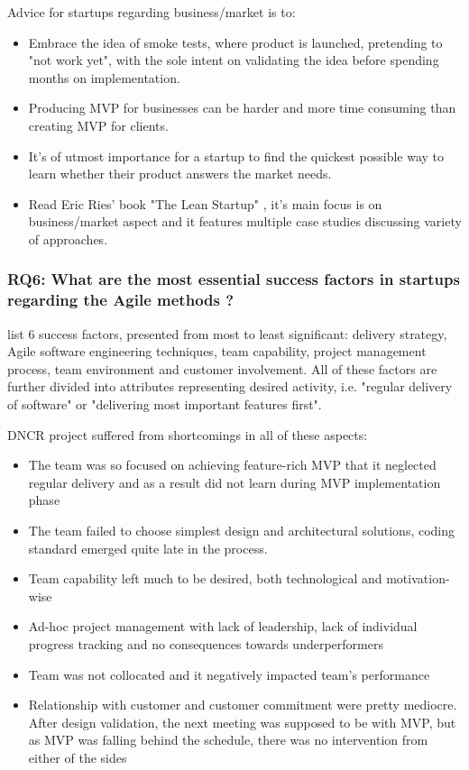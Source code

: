 \documentclass{article}
\begin{document}
Advice for startups regarding business/market is to:
\begin{itemize}
\item Embrace the idea of smoke tests, where product is launched, pretending to "not work yet", with the sole intent on validating the idea before spending months on implementation.
\item Producing MVP for businesses can be harder and more time consuming than creating MVP for clients.
\item It's of utmost importance for a startup to find the quickest possible way to learn whether their product answers the market needs.
\item Read Eric Ries' book "The Lean Startup" \citep{ries2011lean}, it's main focus is on business/market aspect and it features multiple case studies discussing variety of approaches.
\end{itemize}

\subsubsection{RQ6: What are the most essential success factors in startups regarding the Agile methods \citep{cao2008agile}?}
\citeauthor{cao2008agile} list 6 success factors, presented from most to least significant: delivery strategy, Agile software engineering techniques, team capability, project management process, team environment and customer involvement. All of these factors are further divided into attributes representing desired activity, i.e. "regular delivery of software" or "delivering most important features first".

DNCR project suffered from shortcomings in all of these aspects:
\begin{itemize}
\item The team was so focused on achieving feature-rich MVP that it neglected regular delivery and as a result did not learn during MVP implementation phase
\item The team failed to choose simplest design and architectural solutions, coding standard emerged quite late in the process.
\item Team capability left much to be desired, both technological and motivation-wise
\item Ad-hoc project management with lack of leadership, lack of individual progress tracking and no consequences towards underperformers
\item Team was not collocated and it negatively impacted team's performance
\item Relationship with customer and customer commitment were pretty mediocre. After design validation, the next meeting was supposed to be with MVP, but as MVP was falling behind the schedule, there was no intervention from either of the sides
\end{itemize}
\end{document}

